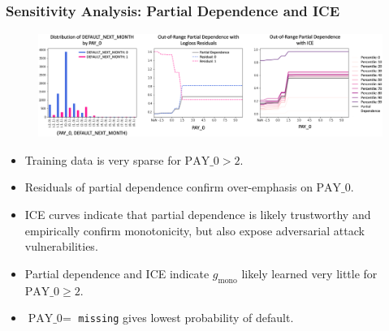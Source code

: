 \documentclass[11pt,
               aspectratio=43,
               hyperref={colorlinks}
               ]{beamer}
\begin{document}
			\begin{frame}[t]
		
				\frametitle{\textbf{Sensitivity Analysis}: Partial Dependence and ICE}
				\vspace{-15pt}
				\begin{figure}
					\begin{center}
						\includegraphics[height=96pt]{img/pd.png}
					\end{center}
				\end{figure}
				\vspace{-10pt}
				\begin{itemize}	
					\item \scriptsize Training data is very sparse for $\text{PAY\_0} > 2$.\\
					\item Residuals of partial dependence confirm over-emphasis on $\text{PAY\_0}$.
					\item ICE curves indicate that partial dependence is likely trustworthy and empirically confirm monotonicity, but also expose adversarial attack vulnerabilities.
					\item Partial dependence and ICE indicate $g_{\text{mono}}$ likely learned very little for $\text{PAY\_0} \geq 2$.
					\item $\text{PAY\_0} = $ \texttt{missing} gives lowest probability of default.
				\end{itemize}\normalsize
		
			\end{frame}
\end{document}
